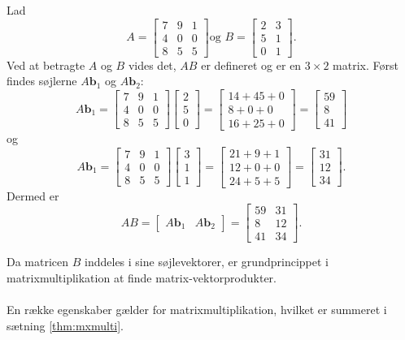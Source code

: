 \begin{eks}
Lad 
$$
A=
\begin{bmatrix}
7 & 9 & 1 \\
4 & 0 & 0 \\
8 & 5 & 5
\end{bmatrix}
\text{og }
B=
\begin{bmatrix}
2 & 3 \\
5 & 1 \\
0 & 1 
\end{bmatrix}
\text{.}
$$
Ved at betragte $A$ og $B$ vides det, $AB$ er defineret og er en $3 \times 2$ matrix. 
Først findes søjlerne $A\textbf{b}_1$ og $A\textbf{b}_2$:
$$
A\textbf{b}_1=
\begin{bmatrix}
7 & 9 & 1 \\
4 & 0 & 0 \\
8 & 5 & 5
\end{bmatrix}
\begin{bmatrix}
2 \\
5 \\
0
\end{bmatrix}
=
\begin{bmatrix}
14 + 45 + 0 \\
8 + 0 + 0 \\
16 + 25 + 0
\end{bmatrix}
=
\begin{bmatrix}
59 \\
8 \\
41
\end{bmatrix}
$$
og
$$
A\textbf{b}_1=
\begin{bmatrix}
7 & 9 & 1 \\
4 & 0 & 0 \\
8 & 5 & 5
\end{bmatrix}
\begin{bmatrix}
3 \\
1 \\
1
\end{bmatrix}
=
\begin{bmatrix}
21 + 9 + 1 \\
12 + 0 + 0 \\
24 + 5 + 5
\end{bmatrix}
=
\begin{bmatrix}
31 \\
12 \\
34
\end{bmatrix}
\text{.}
$$
Dermed er 
$$
AB=
\begin{bmatrix}
A\textbf{b}_1 & A\textbf{b}_2
\end{bmatrix}
=
\begin{bmatrix}
59 & 31 \\
8 & 12 \\
41 & 34
\end{bmatrix}.
$$
\end{eks}
Da matricen $B$ inddeles i sine søjlevektorer, er grundprincippet i matrixmultiplikation at finde matrix-vektorprodukter.\\\\
En række egenskaber gælder for matrixmultiplikation, hvilket er summeret i sætning \ref{thm:mxmulti}.

